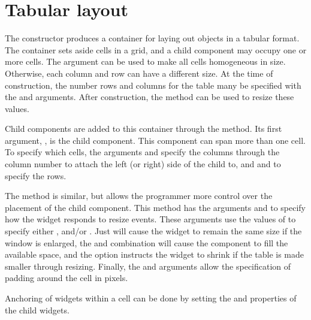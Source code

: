 \section{Tabular layout}
\label{sec:RGtk2:gtkTable}

The  constructor produces a container for laying
out objects in a tabular format. The container sets aside cells in a
grid, and a child component may occupy one or more cells. The
 argument can be used to make all
cells homogeneous in size. Otherwise, each column and row can have a
different size. At the time of construction, the number rows and
columns for the table many be specified with the
 and 
arguments. After construction, the  method
can be used to resize these values.

Child components are added to this container through the
 method. Its first argument,
, is the child component. This
component can span more than one cell. To specify which cells, the
arguments  and
 specify the columns through
the column number to attach the left (or right) side of the child to, and 
 and
 to specify the rows. 

The  method is similar, but allows the
programmer more control over the placement of the child
component. This method has the arguments
 and
 to specify how the widget responds
to resize events. These arguments use the values of
 to specify either ,
 and/or . Just  will cause the
widget to remain the same size if the window is enlarged, the
 and  combination will cause the component
to fill the available space, and the  option instructs
the widget to shrink if the table is made smaller through
resizing. Finally, the  and
 arguments allow the specification
of padding around the cell in pixels.


Anchoring of widgets within a cell can be done by setting the
 and  properties of the child widgets. 

